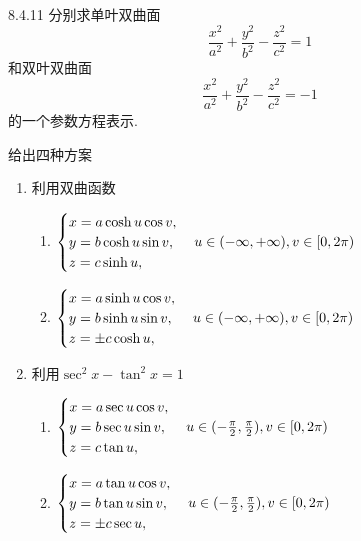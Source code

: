 \begin{exercise}{8.4.11}
    分别求单叶双曲面$$\frac{x^2}{a^2}+\frac{y^2}{b^2}-\frac{z^2}{c^2}=1$$和双叶双曲面$$\frac{x^2}{a^2}+\frac{y^2}{b^2}-\frac{z^2}{c^2}=-1$$的一个参数方程表示.
\end{exercise}
\begin{solution}
    给出四种方案
    \begin{enumerate}
        \item 利用双曲函数
        \begin{multicols}{2}
              \begin{enumerate}
            \item[单叶] 
            $\begin{cases}
                x=a\cosh u\cos v,\\
                y=b\cosh u\sin v,\\
                z=c\sinh u,\\
            \end{cases}\\u\in(-\infty,+\infty),v\in[0,2\pi)$
            \item[双叶] 
            $\begin{cases}
                x=a\sinh u\cos v,\\
                y=b\sinh u\sin v,\\
                z=\pm c\cosh u,\\
            \end{cases}\\u\in(-\infty,+\infty),v\in[0,2\pi)$
        \end{enumerate}
        \end{multicols}

        \item 利用$\sec^2x-\tan^2x=1$
        \begin{multicols}{2}
              \begin{enumerate}
            \item[单叶] 
            $\begin{cases}
                x=a\sec u\cos v,\\
                y=b\sec u\sin v,\\
                z=c\tan u,\\
            \end{cases}\\u\in(-\frac{\pi}{2},\frac{\pi}{2}),v\in[0,2\pi)$
            \item[双叶] 
            $\begin{cases}
                x=a\tan u\cos v,\\
                y=b\tan u\sin v,\\
                z=\pm c\sec u,\\
            \end{cases}\\u\in(-\frac{\pi}{2},\frac{\pi}{2}),v\in[0,2\pi)$
        \end{enumerate}
        \end{multicols}


\end{enumerate}
\end{solution}
